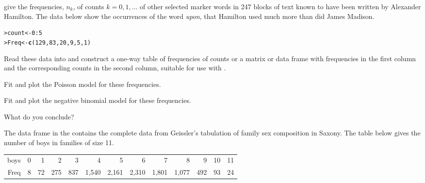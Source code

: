 \documentclass[11pt]{report}\usepackage[]{graphicx}\usepackage[]{color}
\makeatletter
\newcommand{\hlnum}[1]{\textcolor[rgb]{0.686,0.059,0.569}{#1}}%
\newcommand{\hlopt}[1]{\textcolor[rgb]{0,0,0}{#1}}%
\newcommand{\hlstd}[1]{\textcolor[rgb]{0.345,0.345,0.345}{#1}}%
\newcommand{\hlkwb}[1]{\textcolor[rgb]{0.69,0.353,0.396}{#1}}%
\newcommand{\hlkwd}[1]{\textcolor[rgb]{0.737,0.353,0.396}{\textbf{#1}}}%
\newenvironment{kframe}{%
 \def\at@end@of@kframe{}%
 \ifinner\ifhmode%
  \def\at@end@of@kframe{\end{minipage}}%
  \begin{minipage}{\columnwidth}%
 \fi\fi%
 \def\FrameCommand##1{\hskip\@totalleftmargin \hskip-\fboxsep
 \colorbox{shadecolor}{##1}\hskip-\fboxsep
     \hskip-\linewidth \hskip-\@totalleftmargin \hskip\columnwidth}%
 \MakeFramed {\advance\hsize-\width
   \@totalleftmargin\z@ \linewidth\hsize
   \@setminipage}}%
 {\par\unskip\endMakeFramed%
 \at@end@of@kframe}
\newenvironment{knitrout}{}{} %
\renewenvironment{knitrout}{\small\renewcommand{\baselinestretch}{.85}}{} %
\makeatother
\begin{document}
\begin{Exercises}
  \exercise \citet[Table 2.4]{MostellerWallace:63} give the frequencies, $n_k$,
  of counts $k = 0, 1, \dots$ of other selected marker words in 247 blocks
  of text known to have been written by Alexander Hamilton.  The data below
  show the occurrences of the word \emph{upon}, that Hamilton used much more than
  did James Madison.
\begin{knitrout}
\color{fgcolor}\begin{kframe}
\begin{alltt}
\hlstd{> }\hlstd{count} \hlkwb{<-} \hlnum{0} \hlopt{:} \hlnum{5}
\hlstd{> }\hlstd{Freq} \hlkwb{<-} \hlkwd{c}\hlstd{(}\hlnum{129}\hlstd{,} \hlnum{83}\hlstd{,} \hlnum{20}\hlstd{,} \hlnum{9}\hlstd{,} \hlnum{5}\hlstd{,} \hlnum{1}\hlstd{)}
\end{alltt}
\end{kframe}
\end{knitrout}
  \begin{enumerate*}
    \item Read these data into \R and construct a one-way table of frequencies of counts
    or a matrix or data frame with frequencies in the first column and the corresponding counts in the second column, suitable for use with .
    \item Fit and plot the Poisson model for these frequencies.
    \item Fit and plot the negative binomial model for these frequencies.
    \item What do you conclude?
  \end{enumerate*}

  \exercise The data frame  in the  contains the complete data from Geissler's \citeyearpar{Geissler:1889} tabulation of family sex composition in Saxony.  The table below gives the number of boys in families of size 11.

\begin{tabular}{r|rrrrrrrrrrrr}
  \hline
boys &   0 &   1 &   2 &   3 &   4 &   5 &   6 &   7 &   8 &   9 &  10 &  11 \\
  Freq &   8 &  72 & 275 & 837 & 1,540 & 2,161 & 2,310 & 1,801 & 1,077 & 492 &  93 &  24 \\
   \hline
\end{tabular}


\end{Exercises}
\end{document}
